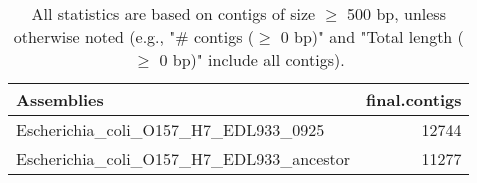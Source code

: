 \documentclass[12pt,a4paper]{article}
\begin{document}
\begin{table}[ht]
\begin{center}
\caption{All statistics are based on contigs of size $\geq$ 500 bp, unless otherwise noted (e.g., "\# contigs ($\geq$ 0 bp)" and "Total length ($\geq$ 0 bp)" include all contigs).}
\begin{tabular}{|l*{1}{|r}|}
\hline
Assemblies & final.contigs \\ \hline
Escherichia\_coli\_O157\_H7\_EDL933\_0925 & 12744 \\ \hline
Escherichia\_coli\_O157\_H7\_EDL933\_ancestor & 11277 \\ \hline
\end{tabular}
\end{center}
\end{table}
\end{document}
